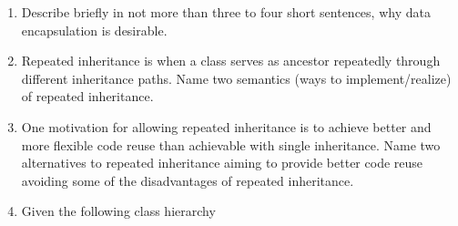 \documentclass{article}
\begin{document}
\begin{enumerate}
\item Describe briefly in not more than three to four short sentences,
  why data encapsulation is desirable.
\item Repeated inheritance is when a class serves as ancestor
  repeatedly through different inheritance paths. Name two semantics
  (ways to implement/realize) of repeated inheritance. 
\item One motivation for allowing repeated inheritance is to achieve
  better and more flexible code reuse than achievable with single
  inheritance. Name two alternatives to repeated inheritance aiming to
  provide better code reuse avoiding some of the disadvantages of
  repeated inheritance. 
\item Given the following class
  hierarchy \\
\begin{center}

\end{center}
\end{enumerate}
\end{document}

